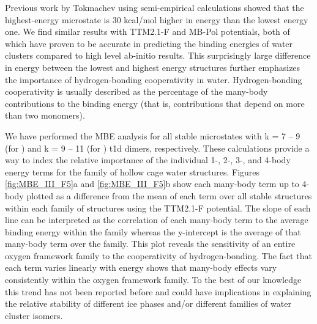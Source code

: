 \documentclass[11pt, proquest]{uwthesis}[2020/02/24]
\let\ce\ch
\newcommand{\textapprox}{\raisebox{0.5ex}{\texttildelow}}
\begin{document}
\par Previous work by Tokmachev using semi-empirical calculations showed that the highest-energy \ce{(H2O)_{20}} microstate is \textapprox 30 kcal/mol higher in energy than the lowest energy one. We find similar results with TTM2.1-F and MB-Pol potentials, both of which have proven to be accurate in predicting the binding energies of water clusters compared to high level ab-initio results. This surprisingly large difference in energy between the lowest and highest energy structures further emphasizes the importance of hydrogen-bonding cooperativity in water. Hydrogen-bonding cooperativity is usually described as the percentage of the many-body contributions to the binding energy (that is, contributions that depend on more than two monomers).\autocite{xantheas_cooperativity_2000}



\par We have performed the MBE analysis for all stable microstates with k = 7 – 9 (for \ce{(H2O)_{24}}) and k = 9 – 11 (for \ce{(H2O)_{28}}) t1d dimers, respectively. These calculations provide a way to index the relative importance of the individual 1-, 2-, 3-, and 4-body energy terms for the family of hollow cage water structures. Figures \ref{fig:MBE_III_F5}a and \ref{fig:MBE_III_F5}b show each many-body term up to 4-body plotted as a difference from the mean of each term over all stable structures within each family of structures using the TTM2.1-F potential. The slope of each line can be interpreted as the correlation of each many-body term to the average binding energy within the family whereas the y-intercept is the average of that many-body term over the family. This plot reveals the sensitivity of an entire oxygen framework family to the cooperativity of hydrogen-bonding. The fact that each term varies linearly with energy shows that many-body effects vary consistently within the oxygen framework family. To the best of our knowledge this trend has not been reported before and could have implications in explaining the relative stability of different ice phases and/or different families of water cluster isomers.
\end{document}
